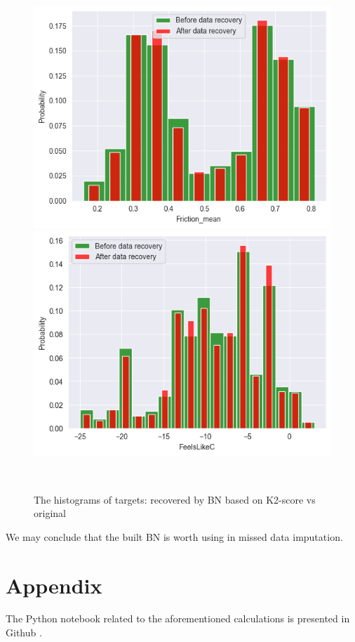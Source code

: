 \documentclass[12pt, bachelor, substylefile = algo_title.rtx]{disser}
\theoremstyle{definition}
\begin{document}
\begin{figure}[!h]
   \begin{minipage}{.48\textwidth}
     \includegraphics[width=\linewidth]{bn31}
   \end{minipage} \hfill
\begin{minipage}{.48\textwidth}
     \includegraphics[width=\linewidth]{bn32}
   \end{minipage}\\
\caption{The histograms of targets: recovered by BN based on K2-score vs original}
\label{fig: 11}
\end{figure}

We may conclude that the built BN is worth using in missed data imputation.

\section{Appendix}
The Python notebook related to the aforementioned calculations is presented in Github \cite{repogithub}.

{\small }

\end{document}
